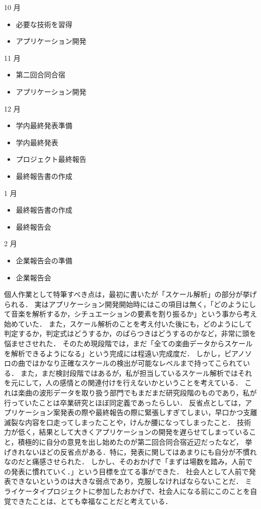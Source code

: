 10 月
\begin{itemize}
\item 必要な技術を習得
\item アプリケーション開発
\end{itemize}
11 月
\begin{itemize}
\item 第二回合同合宿
\item アプリケーション開発
\end{itemize}
12 月
\begin{itemize}
\item 学内最終発表準備
\item 学内最終発表
\item プロジェクト最終報告
\item 最終報告書の作成
\end{itemize}
1 月
\begin{itemize}
\item 最終報告書の作成
\item 最終報告会
\end{itemize}
2 月
\begin{itemize}
\item 企業報告会の準備
\item 企業報告会
\end{itemize}
個人作業として特筆すべき点は，最初に書いたが「スケール解析」の部分が挙げられる．
実はアプリケーション開発開始時にはこの項目は無く，「どのようにして音楽を解析するか，シチュエーションの要素を割り振るか」という事から考え始めていた．
また，スケール解析のことを考え付いた後にも，どのようにして判定するか，判定式はどうするか，のばらつきはどうするのかなど，非常に頭を悩ませさせれた．
そのため現段階では，まだ「全ての楽曲データからスケールを解析できるようになる」という完成には程遠い完成度だ．
しかし，ピアノソロの曲ではかなり正確なスケールの検出が可能なレベルまで持ってこられている．
また，まだ検討段階ではあるが，私が担当しているスケール解析ではそれを元にして，人の感情との関連付けを行えないかということを考えている．
これは楽曲の波形データを取り扱う部門でもまだまだ研究段階のものであり，私が行っていたことは卒業研究とほぼ同定義であったらしい．
反省点としては，アプリケーション案発表の際や最終報告の際に緊張しすぎてしまい，早口かつ支離滅裂な内容を口走ってしまったことや，けんか腰になってしまったこと．
技術力が低く，結果として大きくアプリケーションの開発を遅らせてしまっていること，積極的に自分の意見を出し始めたのが第二回合同合宿近辺だったなど，
挙げきれないほどの反省点がある．特に，発表に関してはあまりにも自分が不慣れなのだと痛感させられた．
しかし、そのおかげで「まずは場数を踏み，人前での発表に慣れていく．」という目標を立てる事ができた．
社会人として人前で発表できないというのは大きな弱点であり，克服しなければならないことだ．
ミライケータイプロジェクトに参加したおかげで、社会人になる前にこのことを自覚できたことは、とても幸福なことだと考えている．\par
{}
